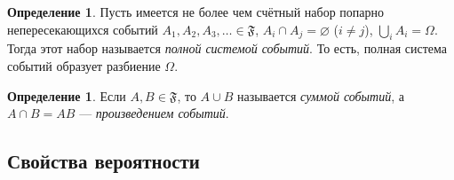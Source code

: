 \documentclass[11pt,openany,a4paper]{scrartcl}
\theoremstyle{plain}
\theoremstyle{definition}
\newtheorem{definition}[theorem]{Определение}
\begin{document}
\begin{definition}
    Пусть имеется не более чем счётный набор попарно непересекающихся событий
    $A_1, A_2, A_3, \ldots \in \mathfrak F$, $A_i \cap A_j = \varnothing$ ($i \neq j$),
    $\bigcup\limits_i A_i = \Omega$. Тогда этот набор называется \emph{полной системой событий}.
    То есть, полная система событий образует разбиение $\Omega$.
\end{definition}
\begin{definition}
    Если $A, B \in \mathfrak F$, то $A \cup B$ называется \emph{суммой событий}, а
    $A \cap B = AB$ — \emph{произведением событий}.
\end{definition}

\subsection{Свойства вероятности}
\end{document}
